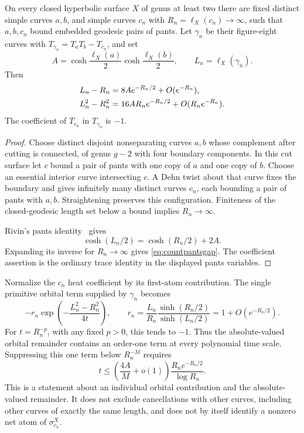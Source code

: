 \begin{proposition}
\label{prop:countnearcollision}
On every closed hyperbolic surface $X$ of genus at least two there
are fixed distinct simple curves $a,b$, and simple curves $c_n$
with $R_n=\ell_X(c_n)\to\infty$, such that $a,b,c_n$ bound
embedded geodesic pairs of pants. Let $\gamma_n$ be their
figure-eight curves with
$T_{\gamma_n}=T_aT_b-T_{c_n}$, and set
\[
 A=\cosh\frac{\ell_X(a)}2\cosh\frac{\ell_X(b)}2,
 \qquad L_n=\ell_X(\gamma_n).
\]
Then
\begin{align}
 L_n-R_n&=8A e^{-R_n/2}+O(e^{-R_n}),\notag\\
 L_n^2-R_n^2&=16A R_n e^{-R_n/2}
                    +O(R_n e^{-R_n}).
 \label{eq:countpantsgap}
\end{align}
The coefficient of $T_{c_n}$ in $T_{\gamma_n}$ is $-1$.
\end{proposition}

\begin{proof}
Choose distinct disjoint nonseparating curves $a,b$ whose complement
after cutting is connected, of genus $g-2$ with four boundary
components. In this cut surface let $c$ bound a pair of pants with
one copy of $a$ and one copy of $b$. Choose an essential interior
curve intersecting $c$. A Dehn twist about that curve fixes the boundary
and gives infinitely many distinct curves $c_n$, each bounding a
pair of pants with $a,b$. Straightening preserves this configuration.
Finiteness of the closed-geodesic length set below a bound implies
$R_n\to\infty$.

Rivin's pants identity~\cite[Theorem 1.3]{RivinFigures} gives
\[
 \cosh(L_n/2)=\cosh(R_n/2)+2A.
\]
Expanding its inverse for $R_n\to\infty$ gives
\eqref{eq:countpantsgap}. The coefficient assertion is the ordinary
trace identity in the displayed pants variables.
\end{proof}

Normalize the $c_n$ heat coefficient by its first-atom contribution.
The single primitive orbital term supplied by $\gamma_n$ becomes
\begin{equation}
 -r_n\exp\!\left(-\frac{L_n^2-R_n^2}{4t}\right),
 \qquad
 r_n=\frac{L_n}{R_n}
       \frac{\sinh(R_n/2)}{\sinh(L_n/2)}
     =1+O(e^{-R_n/2}).
 \label{eq:countnormalizedpants}
\end{equation}
For $t=R_n^{-p}$, with any fixed $p>0$, this tends to $-1$.
Thus the absolute-valued orbital remainder contains an order-one
term at every polynomial time scale. Suppressing this one term
below $R_n^{-M}$ requires
\begin{equation}
 t\leq\left(\frac{4A}{M}+o(1)\right)
       \frac{R_n e^{-R_n/2}}{\log R_n}.
 \label{eq:countnecessarytime}
\end{equation}
This is a statement about an individual orbital contribution and
the absolute-valued remainder. It does not exclude cancellations
with other curves, including other curves of exactly the same
length, and does not by itself identify a nonzero net atom of
$\sigma_{c_n}^X$.

